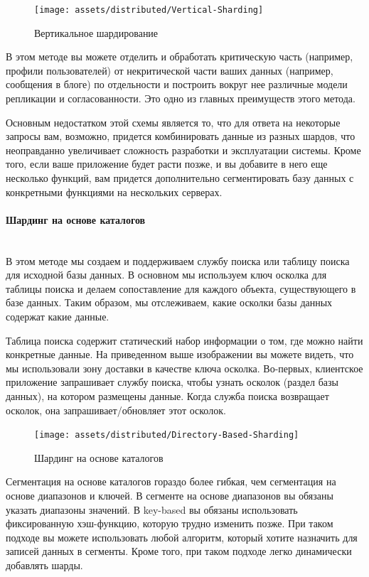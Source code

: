 \begin{figure}[H]
    \centering
    \texttt{[image: assets/distributed/Vertical-Sharding]}
    \caption{Вертикальное шардирование}
    \label{fig:Vertical-Sharding}
\end{figure}

В этом методе вы можете отделить и обработать критическую часть (например, профили пользователей) от некритической части
ваших данных (например, сообщения в блоге) по отдельности и построить вокруг нее различные модели репликации и
согласованности. Это одно из главных преимуществ этого метода.

Основным недостатком этой схемы является то, что для ответа на некоторые запросы вам, возможно, придется комбинировать
данные из разных шардов, что неоправданно увеличивает сложность разработки и эксплуатации системы. Кроме того, если
ваше приложение будет расти позже, и вы добавите в него еще несколько функций, вам придется дополнительно сегментировать
базу данных с конкретными функциями на нескольких серверах. \autocite{DatabaseSharding}

\paragraph{Шардинг на основе каталогов} ~\\
В этом методе мы создаем и поддерживаем службу поиска или таблицу поиска для исходной базы данных. В основном мы
используем ключ осколка для таблицы поиска и делаем сопоставление для каждого объекта, существующего в базе данных.
Таким образом, мы отслеживаем, какие осколки базы данных содержат какие данные.

Таблица поиска содержит статический набор информации о том, где можно найти конкретные данные. На приведенном выше
изображении вы можете видеть, что мы использовали зону доставки в качестве ключа осколка. Во-первых, клиентское
приложение запрашивает службу поиска, чтобы узнать осколок (раздел базы данных), на котором размещены данные. Когда
служба поиска возвращает осколок, она запрашивает/обновляет этот осколок.

\begin{figure}[H]
    \centering
    \texttt{[image: assets/distributed/Directory-Based-Sharding]}
    \caption{Шардинг на основе каталогов}
    \label{fig:Directory-Based-Sharding}
\end{figure}

Сегментация на основе каталогов гораздо более гибкая, чем сегментация на основе диапазонов и ключей. В сегменте на
основе диапазонов вы обязаны указать диапазоны значений. В key-based вы обязаны использовать фиксированную хэш-функцию,
которую трудно изменить позже. При таком подходе вы можете использовать любой алгоритм, который хотите назначить для
записей данных в сегменты. Кроме того, при таком подходе легко динамически добавлять шарды.

